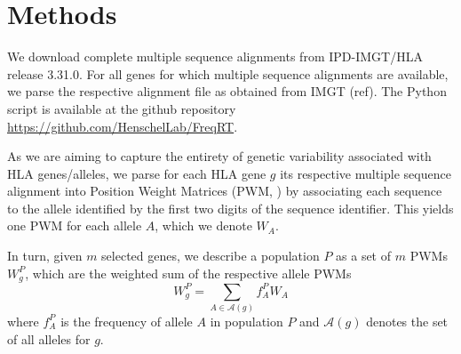 


\section{Methods}

We download complete multiple sequence alignments from IPD-IMGT/HLA release 3.31.0. %
For all genes for which multiple sequence alignments are available, we parse the respective alignment file
as obtained from IMGT (ref). The Python script is available at the github repository
\url{https://github.com/HenschelLab/FreqRT}.


As we are aiming to capture the entirety of genetic variability associated with HLA genes/alleles, we
parse for each HLA gene $g$ its respective multiple sequence alignment into Position Weight Matrices
(PWM, \cite{stormo1982use}) by associating each sequence to the allele identified by the first two digits of the
sequence identifier. This yields one PWM for each allele $A$, which we denote $W_{A}$.

In turn, given $m$ selected genes, we describe a population $P$ as a set of $m$ PWMs $W^P_g$, which are the weighted sum of the respective allele PWMs
\begin{equation}
    W^P_g = \sum_{A\in\mathcal{A}(g)} f_A^P W_{A}
\end{equation}
where $f_A^P$ is the frequency of allele $A$ in population $P$ and $\mathcal{A}(g)$ denotes the set of
all alleles for $g$.

